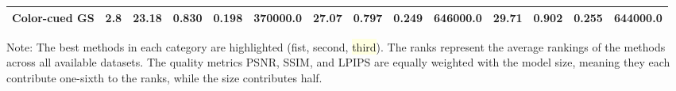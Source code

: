 {\begin{minipage}{\textheight}
\begin{adjustbox}{center}
\begin{tabular}{ll|lllr|lllr|lllr}
Color-cued GS & \cellcolor{lightyellow}2.8 & \cellcolor{lightyellow}23.18 & 0.830 & \cellcolor{lightyellow}0.198 & \cellcolor{lightorange}370000.0 & 27.07 & 0.797 & \cellcolor{lightyellow}0.249 & \cellcolor{lightorange}646000.0 & 29.71 & 0.902 & 0.255 & \cellcolor{lightyellow}644000.0 \\
\bottomrule
\end{tabular}
        \end{adjustbox}
        \newline\newline
        \noindent Note: The best methods in each category are highlighted (\colorbox{lightred}{fist}, \colorbox{lightorange}{second}, \colorbox{lightyellow}{third}). The ranks represent the average rankings of the methods across all available datasets. The quality metrics PSNR, SSIM, and LPIPS are equally weighted with the model size, meaning they each contribute one-sixth to the ranks, while the size contributes half.

    \end{minipage}
}